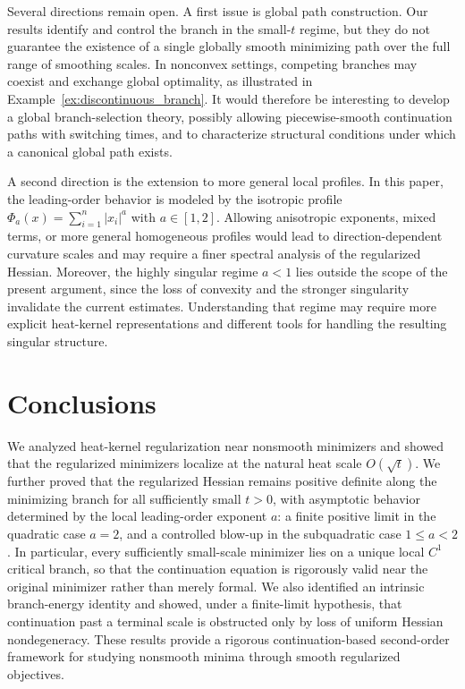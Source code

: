 \documentclass{article}
\begin{document}
Several directions remain open. A first issue is global path construction. Our results identify and control the branch in the small-\(t\) regime, but they do not guarantee the existence of a single globally smooth minimizing path over the full range of smoothing scales. In nonconvex settings, competing branches may coexist and exchange global optimality, as illustrated in Example~\ref{ex:discontinuous_branch}. It would therefore be interesting to develop a global branch-selection theory, possibly allowing piecewise-smooth continuation paths with switching times, and to characterize structural conditions under which a canonical global path exists.

A second direction is the extension to more general local profiles. In this paper, the leading-order behavior is modeled by the isotropic profile $\Phi_a(x)=\sum_{i=1}^n |x_i|^a$ with $a\in[1,2]$. Allowing anisotropic exponents, mixed terms, or more general homogeneous profiles would lead to direction-dependent curvature scales and may require a finer spectral analysis of the regularized Hessian. Moreover, the highly singular regime $a<1$ lies outside the scope of the present argument, since the loss of convexity and the stronger singularity invalidate the current estimates. Understanding that regime may require more explicit heat-kernel representations and different tools for handling the resulting singular structure.

\section{Conclusions}\label{sec:conclusions}
We analyzed heat-kernel regularization near nonsmooth minimizers and showed that the regularized minimizers localize at the natural heat scale $O(\sqrt t)$. We further proved that the regularized Hessian remains positive definite along the minimizing branch for all sufficiently small $t>0$, with asymptotic behavior determined by the local leading-order exponent $a$: a finite positive limit in the quadratic case $a=2$, and a controlled blow-up in the subquadratic case $1\le a<2$. In particular, every sufficiently small-scale minimizer lies on a unique local $C^1$ critical branch, so that the continuation equation is rigorously valid near the original minimizer rather than merely formal. We also identified an intrinsic branch-energy identity and showed, under a finite-limit hypothesis, that continuation past a terminal scale is obstructed only by loss of uniform Hessian nondegeneracy. These results provide a rigorous continuation-based second-order framework for studying nonsmooth minima through smooth regularized objectives.
  

\end{document}
